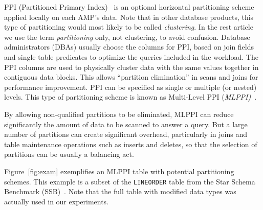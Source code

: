 \documentclass[paper]{ieice}
\begin{document}
PPI (Partitioned Primary Index)~\cite{sinclair:ppi} is an optional horizontal 
partitioning scheme applied locally on each AMP's data. 
Note that in other database products, this type of partitioning would 
most likely to be called {\em clustering}. 
In the rest article we use the term \hbox{{\em partitioning}} only, not clustering, to avoid confusion. 
Database \hbox{administrators} (DBAs) usually choose the columns for PPI, 
based on join fields and single table \hbox{predicates} to optimize the queries included 
in the workload. 
The PPI columns are used to physically cluster data with the same values 
together in contiguous data blocks. 
This allows ``partition elimination'' in scans and joins for performance improvement.
PPI can be specified as single or multiple (or nested) levels. 
This type of partitioning scheme is known as 
Multi-Level PPI ({\em MLPPI)}~\cite{klindt09mlppi}.

By allowing non-qualified partitions to be eliminated, MLPPI can reduce 
significantly the amount of data to be scanned to answer a query. 
But a large number of partitions can create significant overhead, 
particularly in joins and table maintenance operations 
such as inserts and deletes, so that the selection of partitions can be usually a balancing act. 

Figure~\ref{fig:exam} exemplifies an MLPPI table with potential partitioning schemes. 
This example is a subset of the {\tt LINEORDER} table from the Star Schema Benchmark (SSB)~\cite{oneil:ssb}. 
Note that the full table with modified data types was actually used in our experiments. 

\vspace{-.15in}
\end{document}
